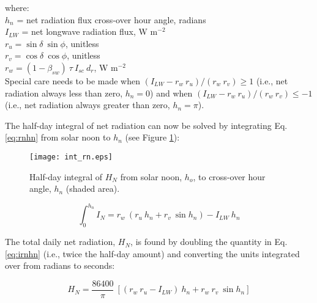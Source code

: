 \noindent where:\\
\indent $h_n$ = net radiation flux cross-over hour angle, radians\\
\indent $I_{LW}$ = net longwave radiation flux, W m$^{-2}$\\
\indent $r_u = \sin\delta\: \sin\phi$, unitless \\
\indent $r_v = \cos\delta\: \cos\phi$, unitless \\
\indent $r_w = \left(1-\beta_{sw}\right)\:\tau\: I_{sc}\: d_r$, W m$^{-2}$\\

\noindent Special care needs to be made when $(I_{LW}-r_w\: r_u)/(r_w\: r_v) \geq 1$ (i.e., net radiation always less than zero, $h_n = 0$) and when $(I_{LW}-r_w\: r_u)/(r_w\: r_v) \leq -1$ (i.e., net radiation always greater than zero, $h_n = \pi$). 

The half-day integral of net radiation can now be solved by integrating Eq. \ref{eq:rnhn} from solar noon to $h_n$ (see Figure \ref{fig:intrn}):

\begin{figure}[ht!]
    \texttt{[image: int\_rn.eps]}
    \caption{Half-day integral of $H_N$ from solar noon, $h_o$, to cross-over hour angle, $h_n$ (shaded area).}
    \label{fig:intrn}
\end{figure}

\begin{equation}
\label{eq:irnhn}
	\int_0^{h_n} I_{N} = r_w\: \left(r_u\: h_n + r_v\: \sin h_n \right) - 
	I_{LW}\: h_n
\end{equation}

\noindent The total daily net radiation, $H_N$, is found by doubling the quantity in Eq. \ref{eq:irnhn} (i.e., twice the half-day amount) and converting the units integrated over from radians to seconds:

\begin{equation}
\label{eq:dayrn}
	H_N = \frac{86400}{\pi}\: \left[ 
	             \left( r_w\: r_u - I_{LW}\right)\: h_n + 
	             r_w\: r_v\: \sin h_n
	         \right]
\end{equation}

